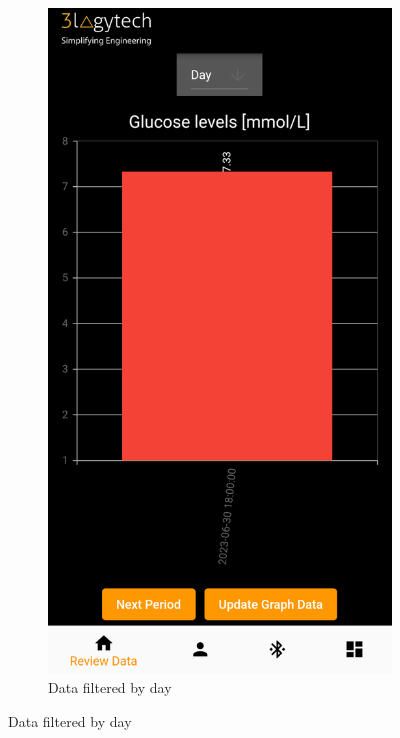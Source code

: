 \documentclass[a4paper]{scrreprt}
\begin{document}
\begin{figure}[h]
\ContinuedFloat
    \begin{subfigure}{0.45\textwidth}
        \centering
        \includegraphics[scale=0.47]{graph_day.png}
        \caption{Data filtered by day}
        \label{fig:graph3}
    \end{subfigure}

\end{figure}
\end{document}
